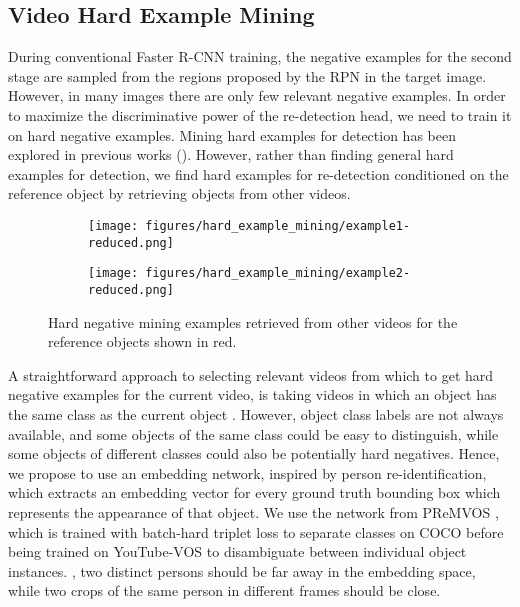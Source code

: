 \documentclass[10pt,twocolumn,letterpaper]{article}
\newcommand{\PAR}[1]{\vskip1pt \noindent {\bf #1~}}
\begin{document}
\subsection{Video Hard Example Mining}
\label{sec:hardexample}
During conventional Faster R-CNN training, the negative examples for the second stage are sampled from the regions proposed by the RPN in the target image. However, in many images there are only few relevant negative examples. In order to maximize the discriminative power of the re-detection head, we need to train it on hard negative examples. Mining hard examples for detection has been explored in previous works (\eg \cite{Felzenszwalb10PAMI,Shrivastava16CVPR}). However, rather than finding general hard examples for detection, we find hard examples for re-detection conditioned on the reference object by retrieving objects from other videos.


\begin{figure}[t]
\begin{center}
\begin{subfigure}{0.47\columnwidth}
\texttt{[image: figures/hard\_example\_mining/example1-reduced.png]}
\end{subfigure}
\hfill
\begin{subfigure}{0.47\columnwidth}
\texttt{[image: figures/hard\_example\_mining/example2-reduced.png]}
\end{subfigure}
\end{center}
\vspace{-4mm}
\caption{\label{fig:hard-example-mining-example}Hard negative mining examples retrieved from other videos for the reference objects shown in red. }
\end{figure}

\PAR{Embedding Network.} A straightforward approach to selecting relevant videos from which to get hard negative examples for the current video, is taking videos in which an object has the same class as the current object \cite{Zhu18ECCV}. However, object class labels are not always available, and some objects of the same class could be easy to distinguish, while some objects of different classes could also be potentially hard negatives. Hence, we propose to use an embedding network, inspired by person re-identification, which extracts an embedding vector for every ground truth bounding box which represents the appearance of that object. We use the network from PReMVOS \cite{Luiten18ACCV}, which is trained with batch-hard triplet loss \cite{Hermans17Arxiv} to separate classes on COCO before being trained on YouTube-VOS to disambiguate between individual object instances. \Eg, two distinct persons should be far away in the embedding space, while two crops of the same person in different frames should be close.
\end{document}
